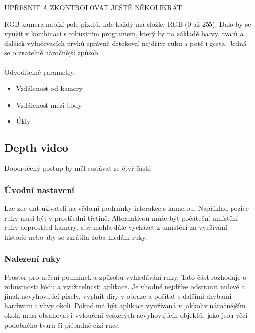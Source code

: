 UPŘESNIT A ZKONTROLOVAT JEŠTĚ NĚKOLIKRÁT

RGB kamera nabízí pole pixelů, kde každý má složky RGB (0 až 255). Dalo by se využít v kombinaci s robustním programem, který by na základě barvy, tvarů a dalších vylučovacích prvků správně detekoval nejdříve ruku a poté i gesta. Jedná se o znatelně náročnější způsob.\\\\
Odvoditelné parametry:\\
\begin{itemize}
\item Vzdálenost od kamery\\
\item Vzdálenost mezi body\\
\item Úhly\\
\end{itemize}

\subsection{Depth video}
Doporučený postup by měl sestávat ze čtyř částí:

\subsubsection{Úvodní nastavení}
Lze zde dát uživateli na vědomí podmínky interakce s kamerou. Například pozice ruky musí být v prostřední třetině. Alternativou může být počáteční umístění ruky doprostřed kamery, aby mohla dále vycházet z umístění za využívání historie nebo aby se zkrátila doba hledání ruky.

\subsubsection{Nalezení ruky}
Prostor pro určení podmínek a způsobu vyhledávání ruky. Tato část rozhoduje o robustnosti kódu a využitelnosti aplikace. Je vhodné nejdříve odstranit nulové a jinak nevyhovující pixely, vyplnit díry v obraze a počítat s dalšími chybami hardwaru i vlivy okolí. Pokud má být aplikace využívaná v jakkoliv náročnějším okolí, musí obsahovat i vyloučení veškerých nevyhovujícíh objektů, jako jsou věci podobného tvaru či případně cizí ruce.

